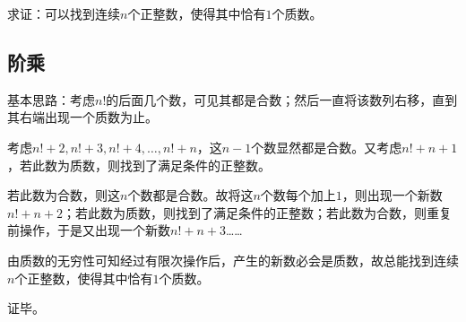 

求证：可以找到连续$n$个正整数，使得其中恰有$1$个质数。

\subsection{阶乘}

基本思路：考虑$n!$的后面几个数，可见其都是合数；然后一直将该数列右移，直到其右端出现一个质数为止。

考虑$n! + 2, n! + 3, n! + 4, \dots, n! + n$，这$n - 1$个数显然都是合数。又考虑$n! + n + 1$，若此数为质数，则找到了满足条件的正整数。

若此数为合数，则这$n$个数都是合数。故将这$n$个数每个加上$1$，则出现一个新数$n! + n + 2$；若此数为质数，则找到了满足条件的正整数；若此数为合数，则重复前操作，于是又出现一个新数$n! + n + 3$……

由质数的无穷性可知经过有限次操作后，产生的新数必会是质数，故总能找到连续$n$个正整数，使得其中恰有$1$个质数。

证毕。
